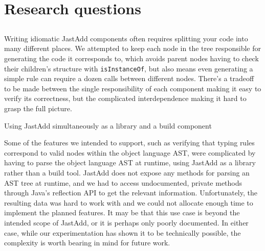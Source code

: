\documentclass[nofilelist]{cslthse-msc}
\begin{document}
\section{Research questions}
\subsection{\rqone}

\subsection{\rqtwo}
\subsection{\rqthree}
Writing idiomatic JastAdd components often requires splitting your code into many different places.
We attempted to keep each node in the tree responsible for generating the code it corresponds to, which avoids parent nodes having to check their children's structure with \verb|isInstanceOf|, but also means even generating a simple rule can require a dozen calls between different nodes.
There's a tradeoff to be made between the single responsibility of each component making it easy to verify its correctness, but the complicated interdependence making it hard to grasp the full picture.

Using JastAdd simultaneously as a library and a build component

Some of the features we intended to support, such as verifying that typing rules correspond to valid nodes within the object language AST, were complicated by having to parse the object language AST at runtime, using JastAdd as a library rather than a build tool.
JastAdd does not expose any methods for parsing an AST tree at runtime, and we had to access undocumented, private methods through Java's reflection API to get the relevant information.
Unfortunately, the resulting data was hard to work with and we could not allocate enough time to implement the planned features.
It may be that this use case is beyond the intended scope of JastAdd, or it is perhaps only poorly documented.
In either case, while our experimentation has shown it to be technically possible, the complexity is worth bearing in mind for future work.
\end{document}
